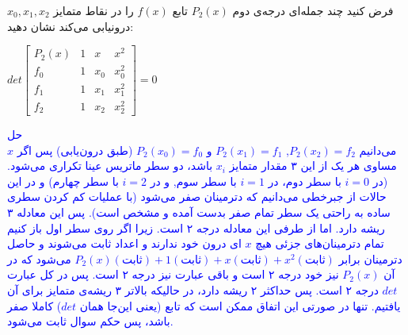 فرض کنید چند جمله‌ای درجه‌ی دوم 
$P_2(x)$
 تابع 
 $f(x)$
 را در نقاط متمایز 
 $x_0,x_1,x_2$
 درونیابی می‌کند نشان‌ دهید:
 
 \begin{center}
 	$det \begin{bmatrix}
 		P_2(x) & 1 & x & x^2\\
 		f_0 & 1 & x_0 & x_0^2 \\ 
 		f_1 & 1 & x_1 & x_1^2 \\
 		f_2 & 1 & x_2 & x_2^2
 	\end{bmatrix} = 0$
 \end{center}
\textcolor{blue}{حل
\\
می‌دانیم
$P_2(x_2) = f_2$,
$P_2(x_1) = f_1$
و
$P_2(x_0) = f_0$
(طبق درون‌یابی)
پس اگر 
$x$
مساوی هر یک از این ۳ مقدار متمایز 
$x_i$
باشد، دو سطر ماتریس عینا تکراری می‌شود. 
(در 
$i = 0$
با سطر دوم، در 
$i = 1$
با سطر سوم,
و در 
$i = 2$
با سطر چهارم)
و در این حالات از جبرخطی می‌دانیم که دترمینان صفر می‌شود (با عملیات کم کردن سطری ساده به راحتی یک سطر تمام صفر بدست آمده و مشخص است). پس این معادله ۳ ریشه دارد. اما از طرفی این معادله درجه ۲ است. زیرا اگر روی سطر اول باز کنیم تمام دترمینان‌های جزئی هیچ 
$x$
ای درون خود ندارند و اعداد ثابت می‌شوند و حاصل دترمینان برابر 
$P_2(x)(\text{ثابت}) + 1 (\text{ثابت}) + x(\text{ثابت}) + x^2 (\text{ثابت})$
می‌شود که در آن 
$P_2(x)$
نیز خود درجه ۲ است و باقی عبارت نیز درجه ۲ است. پس در کل عبارت
$det$
درجه ۲ است. پس حداکثر ۲ ریشه دارد، در حالیکه بالاتر ۳ ریشه‌ی متمایز برای آن یافتیم. تنها در صورتی این اتفاق ممکن است که تابع
(یعنی این‌جا همان
$det$)
کاملا صفر باشد، پس حکم سوال ثابت می‌شود.
}